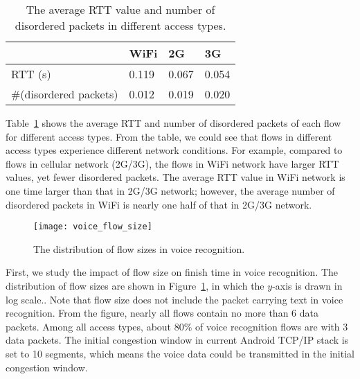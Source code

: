 
\begin{table}[th]
\caption{The average RTT value and number of disordered packets in different access types.}
\label{tab:voice_access_type_stats}
\centering
\renewcommand{\arraystretch}{1.2}
\begin{tabular}{l|l|l|l}
	\toprule
	& WiFi & 2G & 3G \\
	\midrule
	RTT (s) & 0.119 & 0.067 & 0.054 \\
	\hline
	\#(disordered packets) & 0.012 & 0.019 & 0.020 \\
	\bottomrule
\end{tabular}
\end{table}

Table~\ref{tab:voice_access_type_stats} shows the average RTT and number of disordered packets of each flow for different access types. From the table, we could see that flows in different access types experience different network conditions. For example, compared to flows in cellular network (2G/3G), the flows in WiFi network have larger RTT values, yet fewer disordered packets. The average RTT value in WiFi network is one time larger than that in 2G/3G network; however, the average number of disordered packets in WiFi is nearly one half of that in 2G/3G network.

\begin{figure}[th]
	\centering
	\texttt{[image: voice\_flow\_size]}
	\caption{The distribution of flow sizes in voice recognition.}
	\label{fig:voice_flow_size}
\end{figure}

First, we study the impact of flow size on finish time in voice recognition. The distribution of flow sizes are shown in Figure~\ref{fig:voice_flow_size}, in which the $y$-axis is drawn in log scale.. Note that flow size does not include the packet carrying text in voice recognition. From the figure, nearly all flows contain no more than 6 data packets. Among all access types, about 80\% of voice recognition flows are with 3 data packets. The initial congestion window in current Android TCP/IP stack is set to 10 segments\cite{dukkipati2010argument}, which means the voice data could be transmitted in the initial congestion window.

